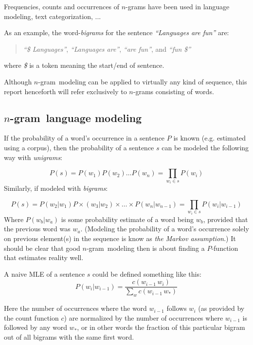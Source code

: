 \documentclass[a4paper,11pt]{kth-mag}
\newcommand{\todo}{ ... }
\newcommand{\ngram}{$n$-gram}
\begin{document}
Frequencies, counts and occurrences of \ngram s have been used in language modeling\cite{chen_goodman}, text categorization\cite{ngrams}, \todo

As an example, the word-\emph{bigrams} for the sentence \emph{``Languages are fun''} are:
\begin{quote}
  \vspace*{0.1cm}
  \centering
\emph{``\$ Languages''}, \emph{``Languages are''}, \emph{``are fun''}, and \emph{``fun \$''}
\end{quote}
where \emph{\$} is a token meaning the start/end of sentence.

Although \ngram~modeling can be applied to virtually any kind of sequence, this report henceforth will refer exclusively to \ngram s consisting of words.

\newpage
\subsection{\ngram~language modeling}
If the probability of a word's occurrence in a sentence $P$ is known (e.g. estimated using a corpus), then the probability of a sentence $s$ can be modeled the following way with \emph{unigrams}:

\begin{equation} \label{eq:unigram_chain_prob}
P(s) = P(w_1) P(w_2) \dots P(w_n) =\prod_{w_i \in s}P(w_i)
\end{equation}
Similarly, if modeled with \emph{bigrams}:

\begin{equation} \label{eq:bigram_chain_prob}
P(s) = P(w_2 | w_1)P\times (w_3 | w_2) \times \dots \times P(w_n | w_{n-1}) = \prod_{w_i \in s}P(w_i|w_{i-1})
\end{equation}
Where $P(w_b | w_a)$ is some probability estimate of a word being $w_b$, provided that the previous word was $w_a$. (Modeling the probability of a word's occurrence solely on previous element(s) in the sequence is know as \emph{the Markov assumption}.) It should be clear that good \ngram~modeling then is about finding a $P$-function that estimates reality well.

A naive \gls{MLE} of a sentence $s$ could be defined something like this:
\begin{equation} \label{eq:bigram_mle}
P(w_i|w_{i-1}) = \frac{c(w_{i-1}\,w_i)}{\sum_{w} c(w_{i-1}\, w_*)}
\end{equation}

Here the number of occurrences where the word $w_{i-1}$ follows $w_i$ (as provided by the count function $c$) are normalized by the number of occurrences where $w_{i-1}$ is followed by any word $w_*$, or in other words the fraction of this particular bigram out of all bigrams with the same first word.
\end{document}
